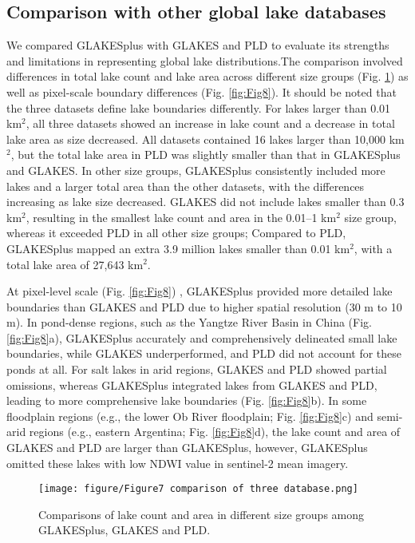 \documentclass[preprint,12pt,authoryear]{elsarticle}
\begin{document}
\subsection{Comparison with other global lake databases}
\label{subsec33}

We compared GLAKESplus with GLAKES and PLD to evaluate its strengths and limitations in representing global lake distributions.The comparison involved differences in total lake count and  lake area across different size groups (Fig. \ref{fig:Fig7}) as well as pixel-scale boundary differences (Fig. \ref{fig:Fig8}). It should be noted that the three datasets define lake boundaries differently. For lakes larger than 0.01 km$^2$, all three datasets showed an increase in lake count and a decrease in total lake area as size decreased. All datasets contained 16 lakes larger than 10,000 km$^2$, but the total lake area in PLD was slightly smaller than that in GLAKESplus and GLAKES. In other size groups, GLAKESplus consistently included more lakes and a larger total area than the other datasets, with the differences increasing as lake size decreased. GLAKES did not include lakes smaller than 0.3 km$^2$, resulting in the smallest lake count and area in the 0.01–1 km$^2$ size group, whereas it exceeded PLD in all other size groups; Compared to PLD, GLAKESplus mapped an extra 3.9 million lakes smaller than 0.01 km$^2$, with a total lake area of 27,643 km$^2$. 

At pixel-level scale (Fig. \ref{fig:Fig8}) , GLAKESplus provided more detailed lake boundaries than GLAKES and PLD due to higher spatial resolution (30 m to 10 m). In pond-dense regions, such as the Yangtze River Basin in China (Fig. \ref{fig:Fig8}a), GLAKESplus accurately and comprehensively delineated small lake boundaries, while GLAKES underperformed, and PLD did not account for these ponds at all. For salt lakes in arid regions, GLAKES and PLD showed partial omissions, whereas GLAKESplus integrated lakes from GLAKES and PLD, leading to more comprehensive lake boundaries (Fig. \ref{fig:Fig8}b). In some floodplain regions (e.g., the lower Ob River floodplain; Fig. \ref{fig:Fig8}c) and semi-arid regions (e.g., eastern Argentina; Fig. \ref{fig:Fig8}d), the lake count and area of GLAKES and PLD are larger than GLAKESplus, however, GLAKESplus omitted these lakes with low NDWI value in sentinel-2 mean imagery.

\begin{figure}[h]
    \centering
    \texttt{[image: figure/Figure7 comparison of three database.png]}
    \caption{Comparisons of lake count and area in different size groups among GLAKESplus, GLAKES and PLD.}
    \label{fig:Fig7}
\end{figure}
\end{document}

